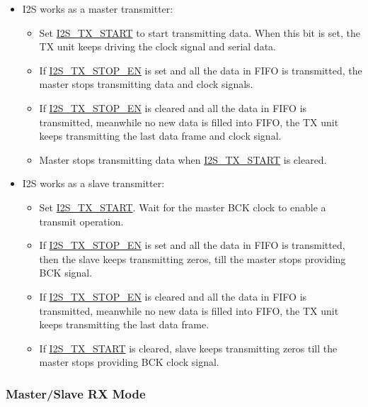 \documentclass[main\_\_EN.tex]{subfiles}
\begin{document}
\begin{itemize}
    \item I2S works as a master transmitter:
    \begin{itemize}
        \item Set \hyperref[fielddesc:I2STXSTART]{I2S\_TX\_START} to start transmitting data. When this bit is set, the TX unit keeps driving the clock signal and serial data.
        \item If \hyperref[fielddesc:I2STXSTOPEN]{I2S\_TX\_STOP\_EN} is set and all the data in FIFO is transmitted, the master stops transmitting data and clock signals.
        \item If \hyperref[fielddesc:I2STXSTOPEN]{I2S\_TX\_STOP\_EN} is cleared and all the data in FIFO is transmitted, meanwhile no new data is filled into FIFO, the TX unit keeps transmitting the last data frame and clock signal.
        \item Master stops transmitting data when \hyperref[fielddesc:I2STXSTART]{I2S\_TX\_START} is cleared.
    \end{itemize}
    \item I2S works as a slave transmitter:
     \begin{itemize}
        \item Set \hyperref[fielddesc:I2STXSTART]{I2S\_TX\_START}. Wait for the master BCK clock to enable a transmit operation.
        \item If \hyperref[fielddesc:I2STXSTOPEN]{I2S\_TX\_STOP\_EN} is set and all the data in FIFO is transmitted, then the slave keeps transmitting zeros, till the master stops providing BCK signal.
        \item If \hyperref[fielddesc:I2STXSTOPEN]{I2S\_TX\_STOP\_EN} is cleared and all the data in FIFO is transmitted, meanwhile no new data is filled into FIFO, the TX unit keeps transmitting the last data frame. 
        \item If \hyperref[fielddesc:I2STXSTART]{I2S\_TX\_START} is cleared, slave keeps transmitting zeros till the master stops providing BCK clock signal.
    \end{itemize}
\end{itemize}

\subsubsection{Master/Slave RX Mode}\label{sec:i2s-master-slave-rx-mode}
\end{document}
